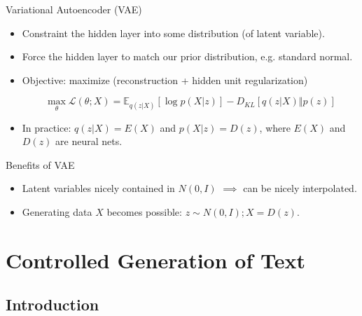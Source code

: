 \documentclass{beamer}
\begin{document}
    \begin{frame}{Variational Autoencoder (VAE)}

        \begin{itemize}
            \item Constraint the hidden layer into some distribution (of latent variable).
            \item Force the hidden layer to match our prior distribution, e.g. standard normal.
            \item Objective: maximize (reconstruction + hidden unit regularization)

            $$\max_{\theta} \mathcal{L}(\theta;X) = \mathbb{E}_{q(z \vert X)}[\log p(X \vert z)] - D_{KL}[q(z \vert X) \Vert p(z)]$$

            \item In practice: $q(z \vert X) = E(X)$ and $p(X \vert z) = D(z)$, where $E(X)$ and $D(z)$ are neural nets.
        \end{itemize}


    \end{frame}

    \begin{frame}{Benefits of VAE}
        \begin{itemize}
            \item Latent variables nicely contained in $N(0, I)$ $\implies$ can be nicely interpolated.
            \item Generating data $X$ becomes possible: $z \sim N(0, I); X = D(z)$.
        \end{itemize}

    \end{frame}

    \section{Controlled Generation of Text}

    \subsection{Introduction}
\end{document}
